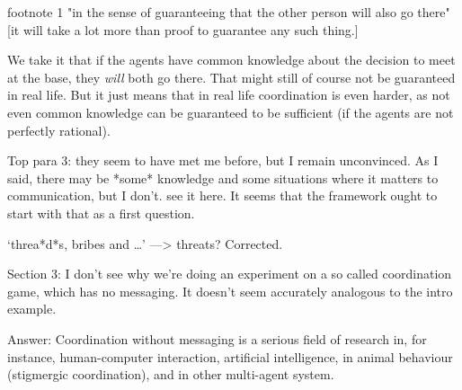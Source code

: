 \documentclass[a4paper]{article}
\newenvironment{response}{\smallskip \noindent \color{blue}}{\color{black}\smallskip}
\newenvironment{robin}{\smallskip \noindent \color{red!10!green!50!blue}}{\color{black}\smallskip}
\begin{document}
footnote 1 "in the sense of guaranteeing that the other person will also go there" [it will take a lot more than proof to guarantee any such thing.]

\begin{response}
We take it that if the agents have common knowledge about the decision to meet at the base, they \emph{will} both go there. That might still of course not be guaranteed in real life. But it just means that in real life coordination is even harder, as not even common knowledge can be guaranteed to be sufficient (if the agents are not perfectly rational).
\end{response}


Top para 3: they seem to have met me before, but I remain unconvinced. As I said, there may be *some* knowledge and some situations where it matters to communication, but I don't. see it here. It seems that the framework ought to start with that as a first question.


`threa*d*s, bribes and …' —> threats?
\begin{response} Corrected. \end{response}

Section 3: I don't see why we're doing an experiment on a so called coordination game, which has no messaging. It doesn't seem accurately analogous to the intro example. 

\begin{robin} Answer: Coordination without messaging is a serious field of research in, for instance, human-computer interaction, artificial intelligence, in animal behaviour (stigmergic coordination), and in other multi-agent system. 
\end{robin}
\end{document}
